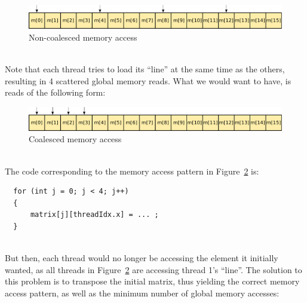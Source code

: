 \documentclass[12pt, a4paper]{report}
\begin{document}
\begin{sloppypar}
\begin{figure}[h]
\centering
\includegraphics[width=\linewidth]{figs/4x4_matrix_non_coalesced_memory_access}
\caption{Non-coalesced memory access}
\label{fig:4x4_matrix_non_coalesced_memory_access}
\end{figure}

\hspace{0pt} \\
Note that each thread tries to load its ``line'' at the same time as the others,
resulting in 4 scattered global memory reads.
What we would want to have, is reads of the following form:

\begin{figure}[h]
\centering
\includegraphics[width=\linewidth]{figs/4x4_matrix_coalesced_memory_access_no_transpose}
\caption{Coalesced memory access}
\label{fig:4x4_matrix_coalesced_memory_access_no_transpose}
\end{figure}

\hspace{0pt} \\
The code corresponding to the memory access pattern in
Figure~\ref{fig:4x4_matrix_coalesced_memory_access_no_transpose} is:

\begin{lstlisting}
  for (int j = 0; j < 4; j++)
  {
      matrix[j][threadIdx.x] = ... ;
  }
\end{lstlisting}

\hspace{0pt} \\
But then, each thread would no longer be accessing the element it initially
wanted, as all threads in
Figure~\ref{fig:4x4_matrix_coalesced_memory_access_no_transpose} are accessing
thread 1's ``line''.
The solution to this problem is to transpose the initial matrix, thus yielding
the correct memory access pattern, as well as the minimum number of global
memory accesses:


\end{sloppypar}
\end{document}
